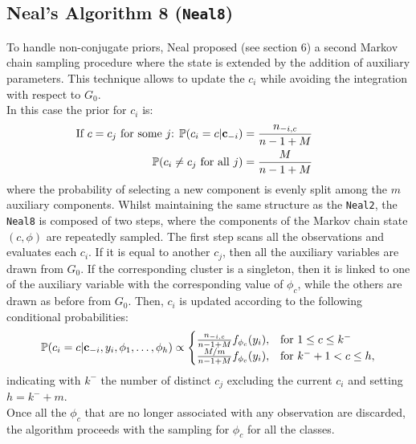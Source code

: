 \subsection{Neal's Algorithm 8 (\texttt{Neal8})}
To handle non-conjugate priors, Neal proposed (see \cite{neal} section 6) a second Markov chain sampling procedure where the state is extended by the addition of auxiliary parameters.
This technique allows to update the $c_i$ while avoiding the integration with respect to $G_0$. \\
In this case the prior for $c_i$ is:
\begin{align}
            \hspace{-25pt}
            \vspace{-12pt}
                \text{If $c=c_j$ for some $j$: } \PP(c_i=c | \mathbf c_{-i}) &= \frac{n_{-i,c}}{n-1+M}   \\
                \PP(c_{i}\neq c_{j} \text{ for all } j) &=\frac{M }{n-1+M}                  \nonumber
\end{align}	
where the probability of selecting a new component is evenly split among the $m$ auxiliary components.
Whilst maintaining the same structure as the \verb|Neal2|, the \verb|Neal8| is composed of two steps, where the components of the Markov chain state $(c,\phi)$ are repeatedly sampled.
The first step scans all the observations and evaluates each $c_i$.
If it is equal to another $c_j$, then all the auxiliary variables are drawn from $G_0$.
If the corresponding cluster is a singleton, then it is linked to one of the auxiliary variable with the corresponding value of $\phi_c$, while the others are drawn as before from $G_0$.
Then, $c_i$ is updated according to the following conditional probabilities:
\begin{align}
	\mathbb P(c_{i}=c | \mathbf c_{-i}, y_{i}, \phi_{1},\dots,\phi_{h}) \propto \begin{cases}  \frac{n_{-i,c}}{n-1+M}f_{\phi_{c}}(y_{i}), & \mbox{for } 1 \leq c \leq k^{-} \\ \frac{M/m}{n-1+M}f_{\phi_{c}}(y_{i}), & \mbox{for } k^{-}+1 < c \leq h,
	\end{cases}
\end{align}
indicating with $k^{-}$ the number of distinct $c_j$ excluding the current $c_i$ and setting $h=k^{-}+m$. \\
Once all the $\phi_c$ that are no longer associated with any observation are discarded, the algorithm proceeds with the sampling for $\phi_c$ for all the classes.

